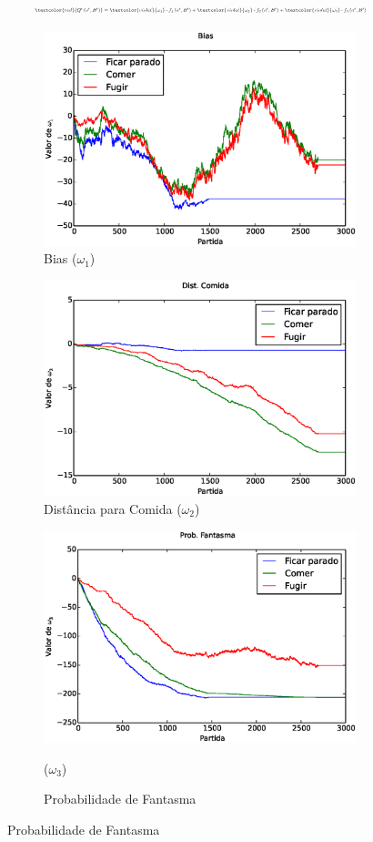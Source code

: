 \documentclass{beamer}
\begin{document}

\begin{frame}
$$
    \resizebox{.8\hsize}{!}{ $
    		\textcolor{red}{ Q^t \left( a^t, B^t \right) } = \textcolor{violet}{ \omega_1 } \cdot f_1 \left( a^t, B^t \right) + \textcolor{violet}{ \omega_2 } \cdot f_2 \left( a^t, B^t \right) + \textcolor{violet}{ \omega_3 } \cdot f_3 \left( a^t, B^t \right)
    $}
$$\pause
\begin{figure}[h]
	\centering
	\begin{subfigure}[t]{.5\textwidth}
		\centering
		\includegraphics[width=.6\linewidth]{images/3_behaviors_small_map/weights____pol__Bias}
		\caption{Bias ($ \omega_1 $)}
		\label{img:3ComportamentosMapaPequeno:PesoBias}
	\end{subfigure}%
	\begin{subfigure}[t]{.5\textwidth}
		\centering
		\includegraphics[width=.6\linewidth]{images/3_behaviors_small_map/weights____pol__DistComida}
		\caption{Distância para Comida ($ \omega_2 $)}
		\label{img:3ComportamentosMapaPequeno:PesoDistComida}
	\end{subfigure}
	\begin{subfigure}[t]{\textwidth}
		\centering
		\includegraphics[width=.3\linewidth]{images/3_behaviors_small_map/weights____pol__ProbFantasma}
		\caption{Probabilidade de Fantasma} ($ \omega_3 $)
	\end{subfigure}
	\label{img:3ComportamentosMapaPequeno:PesoBiasAndDistComida}
\end{figure}
\end{frame}
\end{document}
